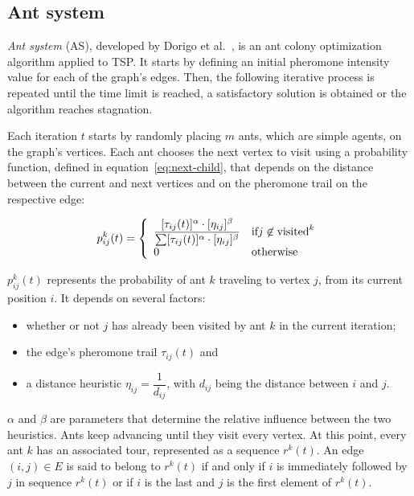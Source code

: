 \subsection{Ant system}
\label{section:ant-system}
\textit{Ant system} (AS), developed by Dorigo et al.~\cite{Dorigo1996aco}, is
an ant colony optimization algorithm applied to TSP. It starts by defining an
initial pheromone intensity value for each of the graph's edges.  Then, the
following iterative process is repeated until the time limit is reached, a
satisfactory solution is obtained or the algorithm reaches stagnation.

Each iteration $t$ starts by randomly placing $m$ ants, which are simple
agents, on the graph's vertices. Each ant chooses the next vertex to visit
using a probability function, defined in equation~\ref{eq:next-child}, that
depends on the distance between the current and next vertices and on the
pheromone trail on the respective edge:

\begin{equation}
p^k_{ij}(t) = \left\{
  \begin{array}{l l}
   \dfrac{[\tau_{ij}(t)]^\alpha \cdot [\eta_{ij}]^\beta}{ \sum [\tau_{ij}(t)]^\alpha \cdot [\eta_{ij}]^\beta} & \mbox{if} j \not\in \mbox{visited}^k \\
   0 & \mbox{otherwise}
  \end{array}
  \right.
  \label{eq:next-child}
\end{equation}

$p^k_{ij}(t)$ represents the probability of ant $k$ traveling to vertex $j$,
from its current position $i$. It depends on several factors:

\begin{itemize}
  \item whether or not $j$ has already been visited by ant $k$ in the current
  iteration;
  \item the edge's pheromone trail $\tau_{ij}(t)$ and
  \item a distance heuristic $\eta_{ij} = \dfrac{1}{d_{ij}}$, with $d_{ij}$
  being the distance between $i$ and $j$.
\end{itemize}

$\alpha$ and $\beta$ are parameters that determine the relative influence
between the two heuristics. Ants keep advancing until they visit every vertex.
At this point, every ant $k$ has an associated tour, represented as a sequence
$r^k(t)$. An edge $(i,j) \in E$ is said to belong to $r^k(t)$ if and only if
$i$ is immediately followed by $j$ in sequence $r^k(t)$ or if $i$ is the last
and $j$ is the first element of $r^k(t)$.

